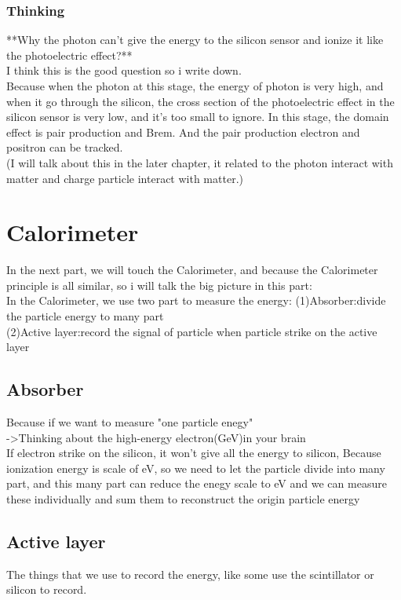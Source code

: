 \documentclass[12pt]{article}
\begin{document}
\subsubsection{Thinking}
**Why the photon can't give the energy to the silicon sensor and ionize it like the photoelectric effect?**\\
I think this is the good question so i write down.\\

Because when the photon at this stage, the energy of photon is very high, and when it go through the silicon, the cross section of the photoelectric effect in the silicon sensor is very low, and it's too small to ignore. In this stage, the domain effect is pair production and Brem. And the pair production electron and positron can be tracked.\\ 
(I will talk about this in the later chapter, it related to the photon interact with matter and charge particle interact with matter.)

\section{Calorimeter}
In the next part, we will touch the Calorimeter, and because the Calorimeter principle is all similar, so i will talk the big picture in this part:\\
In the Calorimeter, we use two part to measure the energy:
(1)Absorber:divide the particle energy to many part\\
(2)Active layer:record the signal of particle when particle strike on the active layer\\
\subsection{Absorber}
Because if we want to measure "one particle enegy"\\
->Thinking about the high-energy electron(GeV)in your brain\\ 
If electron strike on the silicon, it won't give all the energy to silicon,
Because ionization energy is scale of eV, so we need to let the particle divide into many part, and this many part can reduce the enegy scale to eV and we can measure these individually and sum them to reconstruct the origin particle energy
\subsection{Active layer}
The things that we use to record the energy, like some use the scintillator or silicon to record.
\end{document}
